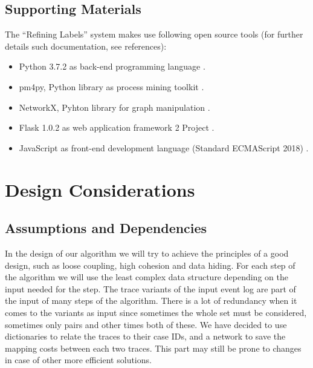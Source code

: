 \documentclass[notitlepage]{article}
\begin{document}
\begin{flushleft}
\subsection{Supporting Materials}
The “Refining Labels” system makes use following open source tools (for further details such documentation, see references): 
\begin{itemize}
\item Python 3.7.2 as back-end programming language \cite{python}.
\item pm4py, Python library as process mining toolkit \cite{pm4py}.
\item NetworkX, Pyhton library for graph manipulation \cite{networkx}. 
\item Flask 1.0.2 as web application framework 2 Project \cite{flask}. 
\item JavaScript as front-end development language (Standard ECMAScript 2018) \cite{js}.
\end{itemize}


\section{Design Considerations}

\subsection{Assumptions and Dependencies}
In the design of our algorithm we will try to achieve the principles of a good design, such as loose coupling, high cohesion and data hiding.
For each step of the algorithm we will use the least complex data structure depending on the input needed for the step.
The trace variants of the input event log are part of the input of many steps of the algorithm.
There is a lot of redundancy when it comes to the variants as input since sometimes the whole set must be considered, sometimes only pairs and other times both of these.
We have decided to use dictionaries to relate the traces to their case IDs, and a network to save the mapping costs between each two traces.
This part may still be prone to changes in case of other more efficient solutions.


\end{flushleft}
\end{document}
